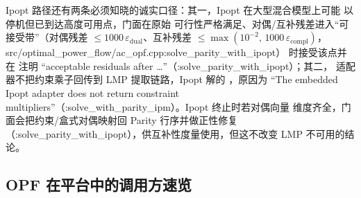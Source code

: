 Ipopt 路径还有两条必须知晓的诚实口径：其一，Ipopt 在大型混合模型上可能
以  停机但已到达高度可用点，门面在原始
可行性严格满足、对偶/互补残差进入“可接受带”（对偶残差
$\le 1000\,\varepsilon_{\mathrm{dual}}$、互补残差
$\le \max(10^{-2},\,1000\,\varepsilon_{\mathrm{compl}})$，src/optimal\_power\_flow/ac\_opf.cpp:solve\_parity\_with\_ipopt）
时接受该点并在  注明
``acceptable residuals after \ldots''（:solve\_parity\_with\_ipopt）；其二，
适配器不把约束乘子回传到 LMP 提取链路，Ipopt 解的
，原因为 ``The embedded Ipopt adapter does not
return constraint multipliers''（:solve\_with\_parity\_ipm）。Ipopt 终止时若对偶向量
维度齐全，门面会把约束/盒式对偶映射回 Parity 行序并做正性修复
（:solve\_parity\_with\_ipopt），供互补性度量使用，但这不改变 LMP 不可用的结论。

\subsection{OPF 在平台中的调用方速览}\label{subsec:overview-callers}

